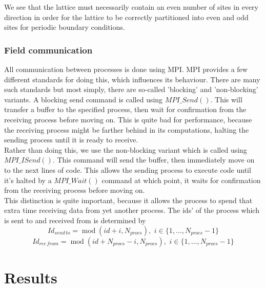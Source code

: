 \documentclass[a4paper,10pt]{book}
\begin{document}
We see that the lattice must necessarily contain an even number of sites in every direction in order for the lattice to be correctly partitioned into even and odd sites for periodic boundary conditions.

\subsection{Field communication}
All communication between processes is done using MPI. MPI provides a few different standards for doing this, which influences its behaviour. There are many such standards but most simply, there are so-called 'blocking' and 'non-blocking' variants. A blocking send command is called using $MPI\_Send()$. This will transfer a buffer to the specified process, then wait for confirmation from the receiving process before moving on. This is quite bad for performance, because the receiving process might be farther behind in its computations, halting the sending process until it is ready to receive.\\Rather than doing this, we use the non-blocking variant which is called using $MPI\_ISend()$. This command will send the buffer, then immediately move on to the next lines of code. This allows the sending process to execute code until it's halted by a $MPI\_Wait()$ command at which point, it waits for confirmation from the receiving process before moving on.\\This distinction is quite important, because it allows the process to spend that extra time receiving data from yet another process. The ids' of the process which is sent to and received from is determined by
\begin{equation}
Id_{send\,to} = \operatorname{mod}(id + i,N_{procs}),\,\,i \in \{ 1,\ldots,N_{procs}-1 \}
\end{equation}
\begin{equation}
Id_{rec\,from} = \operatorname{mod}(id + N_{procs} - i,N_{procs}),\,\,i \in \{ 1,\ldots,N_{procs}-1 \}
\end{equation}

\chapter{Results}\label{chap:results}
\end{document}
